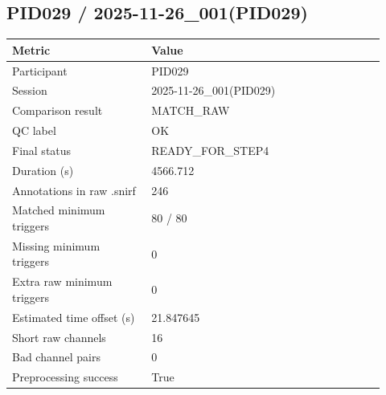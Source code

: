 \subsection*{PID029 / 2025-11-26\_001(PID029)}
\begin{tabular}{p{0.34\linewidth}p{0.58\linewidth}}
\toprule
Metric & Value\\
\midrule
Participant & PID029\\
Session & 2025-11-26\_001(PID029)\\
Comparison result & MATCH\_RAW\\
QC label & OK\\
Final status & READY\_FOR\_STEP4\\
Duration (s) & 4566.712\\
Annotations in raw .snirf & 246\\
Matched minimum triggers & 80 / 80\\
Missing minimum triggers & 0\\
Extra raw minimum triggers & 0\\
Estimated time offset (s) & 21.847645\\
Short raw channels & 16\\
Bad channel pairs & 0\\
Preprocessing success & True\\
\bottomrule
\end{tabular}
